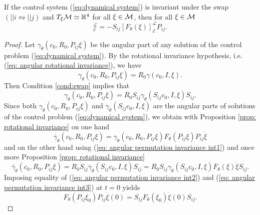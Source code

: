 \begin{proposition}
\label{prop: angular permutation invariance}
If the control system (\ref{eq:dynamical system}) is invariant under the swap $(||i \leftrightsquigarrow ||j)$ and $T_{\xi}\mathcal{M} \simeq \mathbb{R}^4$ for all $\xi \in \mathcal{M}$, then for all $\xi \in \mathcal{M}$
\begin{equation}
[F_{\theta}(P_{ij} \xi)]_{\mathcal{E}}^{\mathcal{L}} = - S_{ij} [F_{\theta}(\xi)]_{\mathcal{E}}^{\mathcal{L}} P_{ij}.
\end{equation}
\end{proposition}

\begin{proof}
Let $\gamma_\theta(c_0, R_0, P_{ij}\xi)$ be the angular part of any solution of the control problem (\ref{eq:dynamical system}). By the rotational invariance hypothesis, i.e. (\ref{eq: angular rotational invariance}), we have
\begin{equation}
	\gamma_\theta(c_0, R_0, P_{ij}\xi) = R_0 \gamma(c_0, I, \xi).
\end{equation}
Then Condition \ref{cond:swap} implies that
\begin{equation}
\label{eq: angular permutation invariance int1}
	\gamma_\theta(c_0, R_0,P_{ij} \xi) = R_0 S_{ij} \gamma_\theta(S_{ij}c_0, I, \xi) S_{ij}.
\end{equation}
Since both $\gamma_\theta(c_0, R_0, P_{ij} \xi)$ and $\gamma_\theta(S_{ij} c_0, I, \xi)$ are the angular parts of solutions of the control problem (\ref{eq:dynamical system}), we obtain with Proposition \ref{prop: rotational invariance} on one hand
\begin{equation}
\label{eq: angular permutation invariance int2}
	\dot{\gamma_\theta}(c_0, R_0, P_{ij} \xi)= \gamma_\theta(c_0, R_0, P_{ij} \xi) F_{\theta}(P_{ij} \xi) P_{ij } \dot{\xi}
\end{equation}
and on the other hand using (\ref{eq: angular permutation invariance int1}) and once more Proposition \ref{prop: rotational invariance}
\begin{equation}
\label{eq: angular permutation invariance int3}
	\dot{\gamma_\theta}(c_0, R_0, P_{ij} \xi) =  R_0 S_{ij} \dot{\gamma_\theta}(S_{ij} c_0, I, \xi) S_{ij} = R_0 S_{ij} \gamma_\theta(S_{ij} c_0, I, \xi) F_{\theta}(\xi) \dot{\xi} S_{ij}.
\end{equation}
Imposing equality of (\ref{eq: angular permutation invariance int2}) and (\ref{eq: angular permutation invariance int3}) at $t = 0$ yields
\begin{equation}
	F_{\theta}(P_{ij} \xi_0) P_{ij}  \dot{\xi}(0) = S_{ij} F_{\theta}(\xi_0) \dot{\xi}(0) S_{ij}.

\end{equation}
\end{proof}
